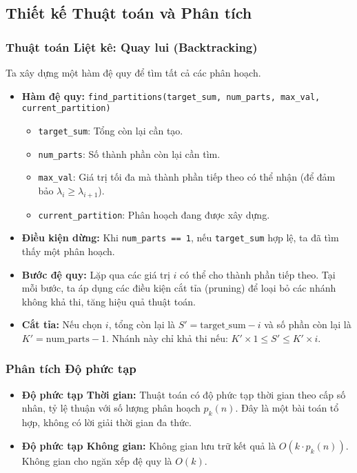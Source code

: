 \documentclass[a4paper,12pt]{article}
\begin{document}
\subsection{Thiết kế Thuật toán và Phân tích}

\subsubsection{Thuật toán Liệt kê: Quay lui (Backtracking)}
Ta xây dựng một hàm đệ quy để tìm tất cả các phân hoạch.
\begin{itemize}
    \item \textbf{Hàm đệ quy:} \texttt{find\_partitions(target\_sum, num\_parts, max\_val, current\_partition)}
    \begin{itemize}
        \item \texttt{target\_sum}: Tổng còn lại cần tạo.
        \item \texttt{num\_parts}: Số thành phần còn lại cần tìm.
        \item \texttt{max\_val}: Giá trị tối đa mà thành phần tiếp theo có thể nhận (để đảm bảo $\lambda_i \ge \lambda_{i+1}$).
        \item \texttt{current\_partition}: Phân hoạch đang được xây dựng.
    \end{itemize}
    \item \textbf{Điều kiện dừng:} Khi \texttt{num\_parts == 1}, nếu \texttt{target\_sum} hợp lệ, ta đã tìm thấy một phân hoạch.
    \item \textbf{Bước đệ quy:} Lặp qua các giá trị $i$ có thể cho thành phần tiếp theo. Tại mỗi bước, ta áp dụng các điều kiện cắt tỉa (pruning) để loại bỏ các nhánh không khả thi, tăng hiệu quả thuật toán.
    \item \textbf{Cắt tỉa:} Nếu chọn $i$, tổng còn lại là $S' = \text{target\_sum} - i$ và số phần còn lại là $K' = \text{num\_parts} - 1$. Nhánh này chỉ khả thi nếu: $K' \times 1 \le S' \le K' \times i$.
\end{itemize}

\subsubsection{Phân tích Độ phức tạp}
\begin{itemize}
    \item \textbf{Độ phức tạp Thời gian:} Thuật toán có độ phức tạp thời gian theo cấp số nhân, tỷ lệ thuận với số lượng phân hoạch $p_k(n)$. Đây là một bài toán tổ hợp, không có lời giải thời gian đa thức.
    \item \textbf{Độ phức tạp Không gian:} Không gian lưu trữ kết quả là $O(k \cdot p_k(n))$. Không gian cho ngăn xếp đệ quy là $O(k)$.
\end{itemize}
\end{document}
